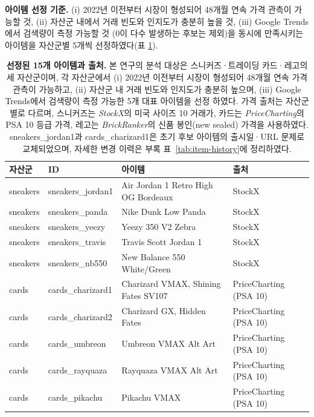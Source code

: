 \documentclass[11pt, a4paper, twocolumn]{article}
\begin{document}
\textbf{아이템 선정 기준.} (i) 2022년 이전부터 시장이 형성되어 48개월
연속 가격 관측이 가능할 것, (ii) 자산군 내에서 거래 빈도와 인지도가
충분히 높을 것, (iii) Google Trends에서 검색량이 측정 가능할 것
(0이 다수 발생하는 후보는 제외)을 동시에 만족시키는 아이템을 자산군별
5개씩 선정하였다(표 \ref{tab:items}).

\begin{table}[!tbp]
\centering\small
\caption[선정된 15개 아이템과 출처]{\textbf{선정된 15개 아이템과
출처.} 본 연구의 분석 대상은 스니커즈·트레이딩 카드·레고의 세 자산군이며,
각 자산군에서 (i) 2022년 이전부터 시장이 형성되어 48개월 연속 가격
관측이 가능하고, (ii) 자산군 내 거래 빈도와 인지도가 충분히 높으며,
(iii) Google Trends에서 검색량이 측정 가능한 5개 대표 아이템을 선정
하였다. 가격 출처는 자산군별로 다르며, 스니커즈는 \emph{StockX}의
미국 사이즈 10 거래가, 카드는 \emph{PriceCharting}의 PSA 10 등급
가격, 레고는 \emph{BrickRanker}의 신품 봉인(new sealed) 가격을
사용하였다. \textsf{sneakers\_jordan1}과 \textsf{cards\_charizard1}은
초기 후보 아이템의 출시일·URL 문제로 교체되었으며, 자세한 변경
이력은 부록 표~\ref{tab:item-history}에 정리하였다.}
\label{tab:items}
\begin{tabular}{llll}
\toprule
자산군 & ID & 아이템 & 출처 \\
\midrule
sneakers & sneakers\_jordan1 & Air Jordan 1 Retro High OG Bordeaux & StockX \\
sneakers & sneakers\_panda   & Nike Dunk Low Panda                  & StockX \\
sneakers & sneakers\_yeezy   & Yeezy 350 V2 Zebra                   & StockX \\
sneakers & sneakers\_travis  & Travis Scott Jordan 1                & StockX \\
sneakers & sneakers\_nb550   & New Balance 550 White/Green          & StockX \\
\midrule
cards    & cards\_charizard1 & Charizard VMAX, Shining Fates SV107  & PriceCharting (PSA 10) \\
cards    & cards\_charizard2 & Charizard GX, Hidden Fates           & PriceCharting (PSA 10) \\
cards    & cards\_umbreon    & Umbreon VMAX Alt Art                 & PriceCharting (PSA 10) \\
cards    & cards\_rayquaza   & Rayquaza VMAX Alt Art                & PriceCharting (PSA 10) \\
cards    & cards\_pikachu    & Pikachu VMAX                         & PriceCharting (PSA 10) \\

\end{tabular}
\end{table}
\end{document}

